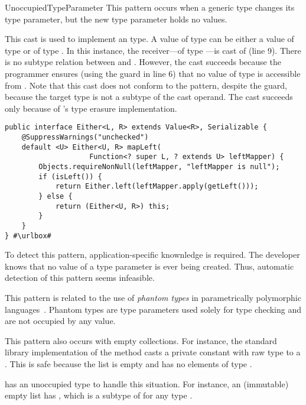 \begin{pattern}{UnoccupiedTypeParameter}
This pattern occurs when a generic type changes its type parameter,
but the new type parameter holds no values.

\instancessrcone{}
This cast is used to implement an  type.
A value of type  can be either a value of type  or of type .
In this instance, the receiver---of type ---is cast of  (line 9).
There is no subtype relation between  and .
However, the cast succeeds because the programmer ensures
(using the guard  in line 6)
that no value of type  is accessible from .
Note that this cast does not conform to the 
pattern, despite the guard, because the target type is not a subtype of the
cast operand.
The cast succeeds only because of \java{}'s type erasure
implementation.

\def\urlvar{http://bit.ly/vavr_io_vavr_2SMIfI2}
\begin{verbatim}
public interface Either<L, R> extends Value<R>, Serializable {
    @SuppressWarnings("unchecked")
    default <U> Either<U, R> mapLeft(
                    Function<? super L, ? extends U> leftMapper) {
        Objects.requireNonNull(leftMapper, "leftMapper is null");
        if (isLeft()) {
            return Either.left(leftMapper.apply(getLeft()));
        } else {
            return (Either<U, R>) this;
        }
    }
} #\urlbox#
\end{verbatim}


\detection{}
To detect this pattern, application-specific knownledge is required.
The developer knows that no value of a type parameter is ever being created. 
Thus, automatic detection of this pattern seems infeasible.

\issues{}
This pattern is related to the use of \emph{phantom types} in parametrically polymorphic languages~\citep{LeijenMeijer99,cheneyHinzePhantomTypes}.
Phantom types are type parameters used solely for type checking and are not occupied by any value.

This pattern also occurs with empty collections.
For instance, the \java{} standard library implementation of the method  casts a private constant with raw type  to a .
This is safe because the list is empty and has no elements of type .

\scala{} has an unoccupied  type to handle this situation.
For instance, an (immutable) empty list has ,
which is a subtype of  for any type .

\end{pattern}